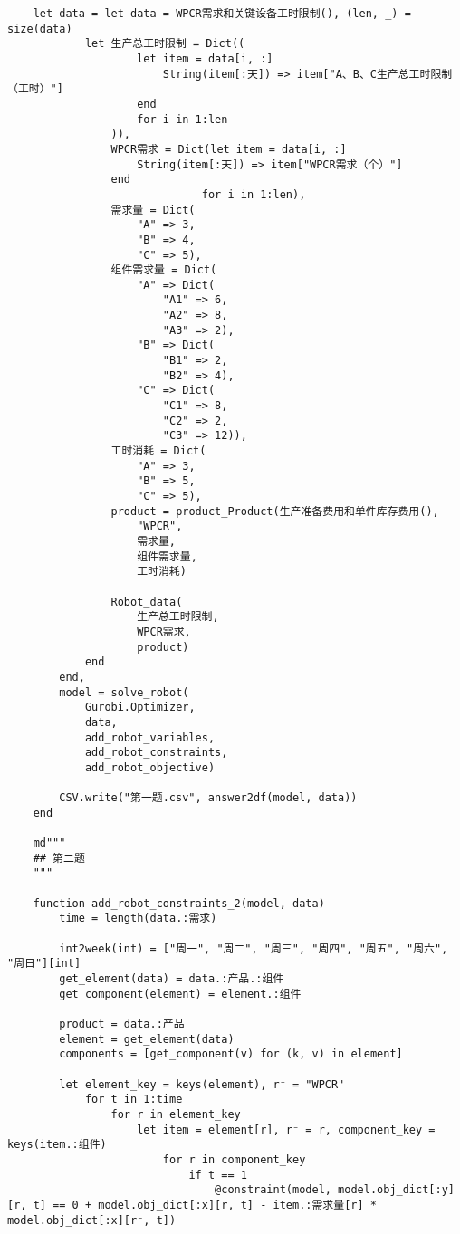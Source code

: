 \begin{appendices}
\begin{lstlisting}
    let data = let data = WPCR需求和关键设备工时限制(), (len, _) = size(data)
            let 生产总工时限制 = Dict((
                    let item = data[i, :]
                        String(item[:天]) => item["A、B、C生产总工时限制（工时）"]
                    end
                    for i in 1:len
                )),
                WPCR需求 = Dict(let item = data[i, :]
                    String(item[:天]) => item["WPCR需求（个）"]
                end
                              for i in 1:len),
                需求量 = Dict(
                    "A" => 3,
                    "B" => 4,
                    "C" => 5),
                组件需求量 = Dict(
                    "A" => Dict(
                        "A1" => 6,
                        "A2" => 8,
                        "A3" => 2),
                    "B" => Dict(
                        "B1" => 2,
                        "B2" => 4),
                    "C" => Dict(
                        "C1" => 8,
                        "C2" => 2,
                        "C3" => 12)),
                工时消耗 = Dict(
                    "A" => 3,
                    "B" => 5,
                    "C" => 5),
                product = product_Product(生产准备费用和单件库存费用(),
                    "WPCR",
                    需求量,
                    组件需求量,
                    工时消耗)

                Robot_data(
                    生产总工时限制,
                    WPCR需求,
                    product)
            end
        end,
        model = solve_robot(
            Gurobi.Optimizer,
            data,
            add_robot_variables,
            add_robot_constraints,
            add_robot_objective)

        CSV.write("第一题.csv", answer2df(model, data))
    end

    md"""
    ## 第二题
    """

    function add_robot_constraints_2(model, data)
        time = length(data.:需求)

        int2week(int) = ["周一", "周二", "周三", "周四", "周五", "周六", "周日"][int]
        get_element(data) = data.:产品.:组件
        get_component(element) = element.:组件

        product = data.:产品
        element = get_element(data)
        components = [get_component(v) for (k, v) in element]

        let element_key = keys(element), r⁻ = "WPCR"
            for t in 1:time
                for r in element_key
                    let item = element[r], r⁻ = r, component_key = keys(item.:组件)
                        for r in component_key
                            if t == 1
                                @constraint(model, model.obj_dict[:y][r, t] == 0 + model.obj_dict[:x][r, t] - item.:需求量[r] * model.obj_dict[:x][r⁻, t])


\end{lstlisting}
\end{appendices}
